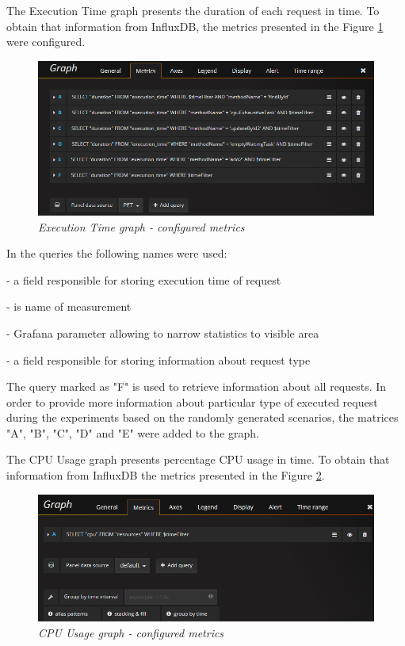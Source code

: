 \documentclass[12pt,a4paper]{article}
\let\tempone\itemize
\let\temptwo\enditemize
\renewenvironment{itemize}{\tempone\addtolength{\itemsep}{-0.4\baselineskip}}{\temptwo}
\begin{document}
The Execution Time graph presents the duration of each request in time. To obtain that information from InfluxDB, the metrics presented in the Figure \ref{figure:grafanametricsexecution} were configured. 

\begin{figure}[!htb]
\centering
\includegraphics[width=1\textwidth]{grafanametricsexecution}
\caption{\textit{Execution Time graph - configured metrics}} \label{figure:grafanametricsexecution}
\end{figure}

In the queries the following names were used: 
\begin{itemize}
\item[duration] - a field responsible for storing execution time of request
\item[execution\_time] - is name of measurement
\item[\$timeFilter] - Grafana parameter allowing to narrow statistics to visible area
\item[methodName] - a field responsible for storing information about request type
\end{itemize} 

The query marked as "F" is used to retrieve information about all requests. 
In order to provide more information about particular type of executed request during the experiments based on the randomly generated scenarios, the matrices  "A", "B", "C", "D" and "E" were added to the graph. 

The CPU Usage graph presents percentage CPU usage in time. To obtain that information from InfluxDB the metrics presented in the Figure \ref{figure:grafanametricscpu}. 

\begin{figure}[!htb]
\centering
\includegraphics[width=1\textwidth]{grafanametricscpu}
\caption{\textit{CPU Usage graph - configured metrics}} \label{figure:grafanametricscpu}
\end{figure}
\end{document}
